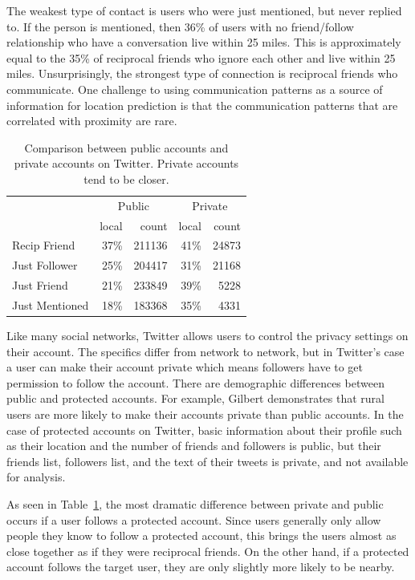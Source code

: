 The weakest type of contact is users who were just mentioned, but never
replied to.
%
If the person is mentioned, then 36\% of users with no
friend/follow relationship who have a conversation live within 25 miles.
%
This is approximately equal to the 35\% of reciprocal friends who ignore each
other and live within 25 miles.
%
Unsurprisingly, the strongest type of connection is reciprocal friends who
communicate.
%
One challenge to using communication patterns as a source of information for
location prediction is that the communication patterns that are correlated
with proximity are rare.

\begin{table}[tbh]
\centering
\begin{tabular}{l | r r | r r}
    & \multicolumn{2}{c}{Public}
    & \multicolumn{2}{|c}{Private} \\
    \cline{2-5}
    &local&count&local&count \\
    \hline
    Recip Friend & 37\%&211136 & 41\%&24873 \\
    Just Follower & 25\%&204417 & 31\%&21168 \\
    Just Friend & 21\%&233849 & 39\%&5228 \\
    Just Mentioned & 18\%&183368 & 35\%&4331 \\
\end{tabular}
\caption{
    Comparison between public accounts and private accounts on Twitter.
    Private accounts tend to be closer.
}
\label{tab:EdgeTypesProt}
\end{table}


Like many social networks, Twitter allows users to control the privacy settings
on their account.
%
The specifics differ from network to network, but in Twitter's case
a user can make their account private which means followers have to get
permission to follow the account.
%
There are demographic differences between public and protected accounts.
%
For example, Gilbert \cite{gilbert2008network} demonstrates that rural users
are more likely to make their accounts private than public accounts.
%
In the case of protected accounts on Twitter, basic information
about their profile such as their location and the number of friends and
followers is public, but their friends list, followers list, and the text of
their tweets is private, and not available for analysis.

As seen in Table~\ref{tab:EdgeTypesProt}, the most dramatic difference between
private and public occurs if a user follows a protected account.
%
Since users generally only allow people they know to follow a protected
account, this brings the users almost as close together as if they were
reciprocal friends.
%
On the other hand, if a protected account follows the target user, they
are only slightly more likely to be nearby.

